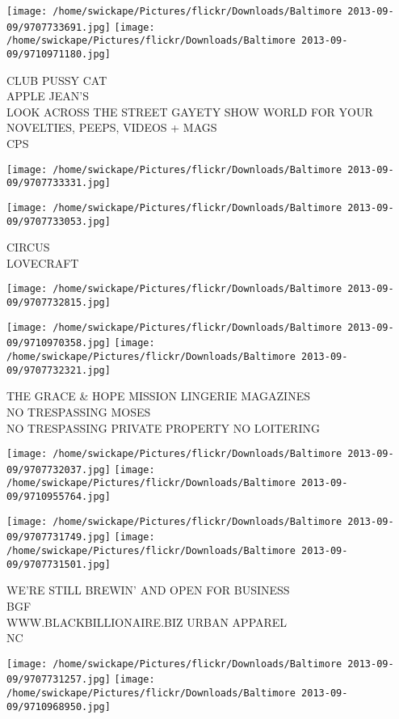 \documentclass[10pt,letterpaper]{article}
\begin{document}
\texttt{[image: /home/swickape/Pictures/flickr/Downloads/Baltimore 2013-09-09/9707733691.jpg]}
\texttt{[image: /home/swickape/Pictures/flickr/Downloads/Baltimore 2013-09-09/9710971180.jpg]}

CLUB PUSSY CAT\\
APPLE JEAN'S\\
LOOK ACROSS THE STREET GAYETY SHOW WORLD FOR YOUR NOVELTIES, PEEPS, VIDEOS + MAGS\\
CPS
\pagebreak

\texttt{[image: /home/swickape/Pictures/flickr/Downloads/Baltimore 2013-09-09/9707733331.jpg]}

\vspace{0.25in}
\texttt{[image: /home/swickape/Pictures/flickr/Downloads/Baltimore 2013-09-09/9707733053.jpg]}

CIRCUS\\
LOVECRAFT
\pagebreak

\texttt{[image: /home/swickape/Pictures/flickr/Downloads/Baltimore 2013-09-09/9707732815.jpg]}

\vspace{0.25in}
\texttt{[image: /home/swickape/Pictures/flickr/Downloads/Baltimore 2013-09-09/9710970358.jpg]}
\texttt{[image: /home/swickape/Pictures/flickr/Downloads/Baltimore 2013-09-09/9707732321.jpg]}

THE GRACE \& HOPE MISSION LINGERIE MAGAZINES\\
NO TRESPASSING MOSES\\
NO TRESPASSING PRIVATE PROPERTY NO LOITERING
\pagebreak

\texttt{[image: /home/swickape/Pictures/flickr/Downloads/Baltimore 2013-09-09/9707732037.jpg]}
\texttt{[image: /home/swickape/Pictures/flickr/Downloads/Baltimore 2013-09-09/9710955764.jpg]}

\texttt{[image: /home/swickape/Pictures/flickr/Downloads/Baltimore 2013-09-09/9707731749.jpg]}
\texttt{[image: /home/swickape/Pictures/flickr/Downloads/Baltimore 2013-09-09/9707731501.jpg]}

WE'RE STILL BREWIN' AND OPEN FOR BUSINESS\\
BGF\\
WWW.BLACKBILLIONAIRE.BIZ URBAN APPAREL\\
NC
\pagebreak

\texttt{[image: /home/swickape/Pictures/flickr/Downloads/Baltimore 2013-09-09/9707731257.jpg]}
\texttt{[image: /home/swickape/Pictures/flickr/Downloads/Baltimore 2013-09-09/9710968950.jpg]}
\end{document}
